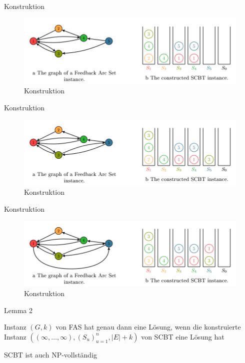 \documentclass{beamer}
\begin{document}
\begin{frame}{Konstruktion}
\begin{figure}[ht]
		\includegraphics[width=\textwidth]{construct09}
		\caption{Konstruktion}
    \end{figure}
\end{frame}

\begin{frame}{Konstruktion}
\begin{figure}[ht]
		\includegraphics[width=\textwidth]{construct10}
		\caption{Konstruktion}
    \end{figure}
\end{frame}

\begin{frame}{Konstruktion}
\begin{figure}[ht]
		\includegraphics[width=\textwidth]{construct}
		\caption{Konstruktion}
    \end{figure}
\end{frame}

\begin{frame}{Lemma 2}
\begin{pointlist}
\item Instanz $(G,k)$ von FAS hat genau dann eine Lösung, wenn die konstruierte Instanz $((\infty, \dots, \infty), (S_u)_{u=1}^n, |E|+k)$ von SCBT eine Lösung hat
\begin{arrowlist}
\item SCBT ist auch NP-vollständig
\end{arrowlist}
\end{pointlist}
\end{frame}
\end{document}
